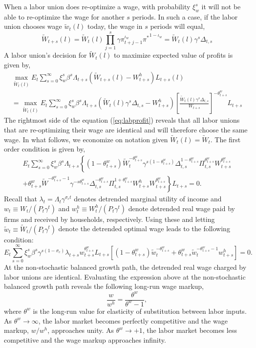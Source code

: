 \documentclass[11pt]{article}
\newcommand{\beq}{\begin{equation}}
\newcommand{\eeq}{\end{equation}}
\newcommand{\ds}{\displaystyle}
\newcommand{\eqref}[1]{(\ref{#1})}
\begin{document}
When a labor union does re-optimize a wage, with probability $\xi_w^s$ it will not be able to re-optimize the wage for another $s$ periods.  In such a case, if the labor union chooses wage $\tilde{w}_t(l)$ today, the wage in $s$ periods will equal,
\beq \tilde{W}_{t+s}(l) = \tilde{W}_t(l) \prod_{j=1}^s \gamma \pi_{t+j-1}^{\iota_w} {\pi^*}^{1-\iota_w} = \tilde{W}_t(l) \gamma^s \Delta_{t,s} \eeq
A labor union's decision for $\tilde{W}_t(l)$ to maximize expected value of profits is given by,
\beq \label{eq:labprofit} \begin{array}{c} \ds \max_{\tilde{W}_t(l)} E_t \sum_{s=0}^{\infty} \xi_w^s \beta^s \Lambda_{t+s} \left( \tilde{W}_{t+s}(l) - W_{t+s}^h \right) L_{t+s}(l) \\ [1.5pc]
= \ds \max_{\tilde{W}_t(l)} E_t \sum_{s=0}^{\infty} \xi_w^s \beta^s \Lambda_{t+s} \left(\tilde{W}_t(l) \gamma^s \Delta_{t,s} - W_{t+s}^h \right) \left[ \frac{\tilde{W}_t(l) \gamma^s \Delta_{t,s}}{W_{t+s}} \right]^{-\theta_{t+s}^w} L_{t+s}  \end{array} \eeq
The rightmost side of the equation \eqref{eq:labprofit} reveals that all labor unions that are re-optimizing their wage are identical and will therefore choose the same wage.  In what follows, we economize on notation given $\tilde{W}_t(l) = \tilde{W}_t$.  The first order condition is given by,
\beq \begin{array}{c} \ds E_t \sum_{s=0}^{\infty} \xi_w^s \beta^s \Lambda_{t+s} \left\{ (1-\theta_{t+s}^w) \tilde{W}_t^{-\theta_{t+s}^w} \gamma^{s(1-\theta_{t+s}^w)} \Delta_{t,s}^{1-\theta_{t+s}^w} \Pi_{t,s}^{\theta_{t+s}^w} W_{t+s}^{\theta_{t+s}^w}  \right. \\ [1.5pc]
+ \left. \theta_{t+s}^w \tilde{W}^{-\theta_{t+s}^w - 1} \gamma^{-s \theta_{t+s}^w} \Delta_{t,s}^{-\theta_{t+s}^w} \Pi_{t,s}^{1+\theta_{t+s}^w} W_{t+s}^h W_{t+s}^{\theta_{t+s}^w} \right\} L_{t+s} = 0. \end{array} \eeq
Recall that $\lambda_t = \Lambda_t \gamma^{\sigma_c t}$ denotes detrended marginal utility of income and $w_t \equiv W_t / (P_t \gamma^t)$ and $w_t^h \equiv W_t^h / (P_t \gamma^t)$ denote detrended real wage paid by firms and received by households, respectively.  Using these and letting $\tilde{w}_t \equiv \tilde{W}_t / (P_t \gamma^t)$ denote the detrended optimal wage leads to the following condition:
\beq E_t \sum_{s=0}^{\infty} \xi_w^s \beta^s \gamma^{s(1-\sigma_c)} \lambda_{t+s} w_{t+s}^{\theta_{t+s}^w} L_{t+s} \left[ (1 - \theta_{t+s}^w) \tilde{w}_t^{-\theta_{t+s}^w}  + \theta_{t+s}^w \tilde{w}_t^{-\theta_{t+s}^w-1} w_{t+s}^h \right] =0.\eeq
At the non-stochastic balanced growth path, the detrended real wage charged by labor unions are identical.  Evaluating the expression above at the non-stochastic balanced growth path reveals the following long-run wage markup,
\beq \frac{w}{w^h} = \frac{\theta^w}{\theta^w-1}, \eeq
where $\theta^w$ is the long-run value for elasticity of substitution between labor inputs.  As $\theta^w \rightarrow \infty$, the labor market becomes perfectly competitive and the wage markup, $w/w^h$, approaches unity.  As $\theta^w \rightarrow+ 1$, the labor market becomes less competitive and the wage markup approaches infinity.
\end{document}
